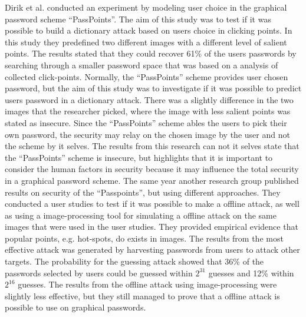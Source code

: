   Dirik et al. \cite{Dirik} conducted an experiment by modeling user choice in the graphical password scheme ``PassPoints''. The aim of this study was to test if it was possible to build a dictionary attack based on users choice in clicking points. In this study they predefined two different images with a different level of salient points. The results stated that they could recover 61\% of the users passwords by searching through a smaller password space that was based on a analysis of collected click-points. Normally, the ``PassPoints'' scheme provides user chosen password, but the aim of this study was to investigate if it was possible to predict users password in a dictionary attack. There was a slightly difference in the two images that the researcher picked, where the image with less salient points was stated as insecure. Since the ``PassPoints'' scheme ables the users to pick their own password, the security may relay on the chosen image by the user and not the scheme by it selves. The results from this research can not it selves state that the ``PassPoints'' scheme is insecure, but highlights that it is important to consider the human factors in security because it may influence the total security in a graphical password scheme. 
  The same year another research group published \cite{Thorpe2} results on security of the ``Passpoints'', but using different approaches. They conducted a user studies to test if it was possible to make a offline attack, as well as using a image-processing tool for simulating a offline attack on the same images that were used in the user studies. They provided empirical evidence that popular points, e.g. hot-spots, do exists in images. The results from the most effective attack was generated by harvesting passwords from users to attack other targets. The probability for the guessing attack showed that 36\% of the passwords selected by users could be guessed within $2^{31}$ guesses and 12\% within $2^{16}$ guesses. The results from the offline attack using image-processing were slightly less effective, but they still managed to prove that a offline attack is possible to use on graphical passwords.   


